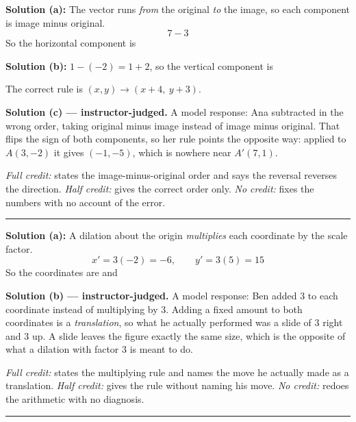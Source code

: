 \documentclass[12pt]{article}
\begin{document}




\textbf{Solution (a):} The vector runs \emph{from} the original \emph{to} the image, so each component is image minus original.
\[ 7 - 3 \]
So the horizontal component is 

\textbf{Solution (b):} $1 - (-2) = 1 + 2$, so the vertical component is 

The correct rule is $(x, y) \to (x + 4,\ y + 3)$.

\textbf{Solution (c) --- instructor-judged.} A model response: Ana subtracted in the wrong order, taking original minus image instead of image minus original. That flips the sign of both components, so her rule points the opposite way: applied to $A(3, -2)$ it gives $(-1, -5)$, which is nowhere near $A'(7, 1)$.

\emph{Full credit:} states the image-minus-original order and says the reversal reverses the direction. \emph{Half credit:} gives the correct order only. \emph{No credit:} fixes the numbers with no account of the error.

\vspace{0.2cm}\noindent\rule{\linewidth}{0.2pt}


\textbf{Solution (a):} A dilation about the origin \emph{multiplies} each coordinate by the scale factor.
\[ x' = 3(-2) = -6, \qquad y' = 3(5) = 15 \]
So the coordinates are  and 

\textbf{Solution (b) --- instructor-judged.} A model response: Ben added $3$ to each coordinate instead of multiplying by $3$. Adding a fixed amount to both coordinates is a \emph{translation}, so what he actually performed was a slide of $3$ right and $3$ up. A slide leaves the figure exactly the same size, which is the opposite of what a dilation with factor $3$ is meant to do.

\emph{Full credit:} states the multiplying rule and names the move he actually made as a translation. \emph{Half credit:} gives the rule without naming his move. \emph{No credit:} redoes the arithmetic with no diagnosis.

\vspace{0.2cm}\noindent\rule{\linewidth}{0.2pt}
\end{document}
